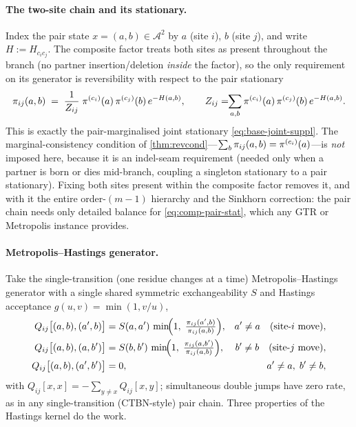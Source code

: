 \paragraph{The two-site chain and its stationary.} Index the pair state
$x=(a,b)\in\mathcal{A}^2$ by $a$ (site $i$), $b$ (site $j$), and write
$H:=H_{c_ic_j}$. The composite factor treats both sites as present
throughout the branch (no partner insertion/deletion \emph{inside} the
factor), so the only requirement on its generator is reversibility with
respect to the pair stationary
\begin{equation}
  \pi_{ij}(a,b)\;=\;\frac{1}{Z_{ij}}\;
     \pi^{(c_i)}(a)\,\pi^{(c_j)}(b)\,e^{-H(a,b)},
  \qquad
  Z_{ij}=\!\!\sum_{a,b}\pi^{(c_i)}(a)\,\pi^{(c_j)}(b)\,e^{-H(a,b)}.
  \label{eq:comp-pair-stat}
\end{equation}
This is exactly the pair-marginalised joint stationary
\eqref{eq:base-joint-suppl}. The marginal-consistency condition of
\autoref{thm:revcond}---$\sum_b\pi_{ij}(a,b)=\pi^{(c_i)}(a)$---is
\emph{not} imposed here, because it is an indel-seam requirement (needed
only when a partner is born or dies mid-branch, coupling a singleton
stationary to a pair stationary). Fixing both sites present within the
composite factor removes it, and with it the entire order-$(m{-}1)$
hierarchy and the Sinkhorn correction: the pair chain needs only detailed
balance for \eqref{eq:comp-pair-stat}, which any GTR or Metropolis
instance provides.

\paragraph{Metropolis--Hastings generator.} Take the single-transition
(one residue changes at a time) Metropolis--Hastings generator with a
single shared symmetric exchangeability $S$ and Hastings acceptance
$g(u,v)=\min(1,v/u)$,
\begin{align}
  Q_{ij}\bigl[(a,b),(a',b)\bigr]
     &= S(a,a')\,\min\!\Bigl(1,\;\tfrac{\pi_{ij}(a',b)}{\pi_{ij}(a,b)}\Bigr),
     & a'\neq a \quad(\text{site-}i\text{ move}),
     \label{eq:comp-mh-imove}\\
  Q_{ij}\bigl[(a,b),(a,b')\bigr]
     &= S(b,b')\,\min\!\Bigl(1,\;\tfrac{\pi_{ij}(a,b')}{\pi_{ij}(a,b)}\Bigr),
     & b'\neq b \quad(\text{site-}j\text{ move}),
     \label{eq:comp-mh-jmove}\\
  Q_{ij}\bigl[(a,b),(a',b')\bigr] &= 0,
     & a'\neq a,\; b'\neq b,
     \label{eq:comp-mh-double}
\end{align}
with $Q_{ij}[x,x]=-\sum_{y\neq x}Q_{ij}[x,y]$; simultaneous double jumps
have zero rate, as in any single-transition (CTBN-style) pair chain.
Three properties of the Hastings kernel do the work.

